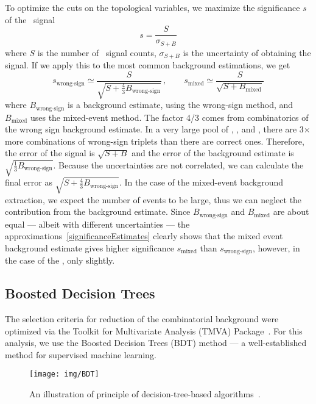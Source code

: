 To optimize the cuts on the topological variables, we maximize the significance $s$ of the \Lambdac\ signal
\begin{equation} \label{significance}
 s = \frac{S}{\sigma_{S+B}}
\end{equation}
where $S$ is the number of \Lambdac\ signal counts, $\sigma_{S+B}$ is the uncertainty of obtaining the signal.
If we apply this to the most common background estimations, we get
\begin{equation} \label{significanceEstimates}
  s_\text{wrong-sign} \simeq \frac{S}{\sqrt{S+\frac{4}{3}B_\text{wrong-sign}}}\,, \qquad
 s_\text{mixed} \simeq \frac{S}{\sqrt{S + B_\text{mixed}}} 
\end{equation}
where $B_\text{wrong-sign}$ is a background estimate, using the wrong-sign method, and $B_\text{mixed}$ uses the mixed-event method. The factor 4/3 comes from combinatorics of the wrong sign background estimate. In a very large pool of \pipm, \Kmp, and \ppm, there are 3$\times$ more combinations of wrong-sign triplets than there are correct ones. Therefore, the error of the signal is $\sqrt{S + B}$ and the error of the background estimate is $\sqrt{\frac{1}{3}B_\text{wrong-sign}}$\@. Because the uncertainties are not correlated, we can calculate the final error as $\sqrt{S+\frac{4}{3}B_\text{wrong-sign}}$\@. In the case of the mixed-event background extraction, we expect the number of events to be large, thus we can neglect the contribution from the background estimate. Since $B_\text{wrong-sign}$ and $B_\text{mixed}$ are about equal --- albeit with different uncertainties --- the approximations~\eqref{significanceEstimates} clearly shows that the mixed event background estimate gives higher significance $s_\text{mixed}$ than $s_\text{wrong-sign}$, however, in the case of the \Lambdac, only slightly.

\subsection{Boosted Decision Trees}

The selection criteria for reduction of the combinatorial background were optimized via the Toolkit for Multivariate Analysis (TMVA) Package~\cite{TMVA}. For this analysis, we use the Boosted Decision Trees (BDT) method --- a well-established method for supervised machine learning. 

\begin{figure}[!htb]
\centering
\texttt{[image: img/BDT]}
\caption{\label{BDT}An illustration of principle of decision-tree-based algorithms~\cite{TMVA}\@.}
\end{figure}


